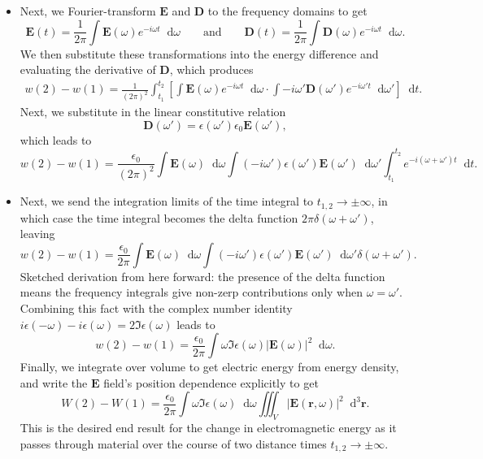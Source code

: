 \documentclass[11pt, a4paper]{article}
\newcommand{\diff}{\mathop{}\!\mathrm{d}} %
\newcommand{\dr}{\diff^{3} \r}  %
\renewcommand{\vec}[1]{\bm{#1}} %
\renewcommand{\r}{\vec{r}}
\newcommand{\E}{\vec{E}} %
\newcommand{\D}{\vec{D}}  %
\newcommand{\ee}{\epsilon_{0}}  %
\begin{document}
\begin{itemize}
    \item Next, we Fourier-transform $ \E $ and $ \D $ to the frequency domains to get
    \begin{equation*}
        \E(t) = \frac{1}{2\pi} \int \E(\omega) e^{-i\omega t} \diff \omega \qquad \text{and} \qquad \D(t) = \frac{1}{2\pi} \int \D(\omega) e^{-i\omega t} \diff \omega.
    \end{equation*}
    We then substitute these transformations into the energy difference and evaluating the derivative of $ \D $, which produces
    \begin{align*}
        w(2) - w(1) = \frac{1}{(2\pi)^{2}}\int_{t_{1}}^{t_{2}} \left[ \int \E(\omega)e^{-i\omega t} \diff \omega \cdot \int -i \omega' \D(\omega')e^{-i\omega't} \diff \omega' \right] \diff t.
    \end{align*}
    Next, we substitute in the linear constitutive relation
    \begin{equation*}
        \D(\omega') = \epsilon(\omega')\ee \E(\omega'),
    \end{equation*}
    which leads to
    \begin{equation*}
        w(2) - w(1) = \frac{\ee}{(2\pi)^{2}} \int \E(\omega) \diff \omega \int  (-i\omega')\epsilon(\omega')\E(\omega') \diff \omega' \int_{t_{1}}^{t_{2}} e^{-i(\omega + \omega')t} \diff t.
    \end{equation*}
    
    \item Next, we send the integration limits of the time integral to $ t_{1, 2} \to \pm \infty $, in which case the time integral becomes the delta function $ 2\pi \delta(\omega + \omega') $, leaving
    \begin{equation*}
        w(2) - w(1) = \frac{\ee}{2\pi} \int \E(\omega) \diff \omega \int  (-i\omega')\epsilon(\omega')\E(\omega') \diff \omega' \delta(\omega + \omega').
    \end{equation*}
    Sketched derivation from here forward: the presence of the delta function means the frequency integrals give non-zerp contributions only when $ \omega = \omega' $. Combining this fact with the complex number identity $ i\epsilon(-\omega) - i \epsilon(\omega) = 2\Im \epsilon(\omega)$ leads to
    \begin{equation*}
        w(2) - w(1) = \frac{\ee}{2\pi} \int \omega \Im \epsilon(\omega) \big |\E(\omega)\big |^{2}  \diff \omega.
    \end{equation*}
    Finally, we integrate over volume to get electric energy from energy density, and write the $ \E $ field's position dependence explicitly to get
    \begin{equation*}
        W(2) - W(1) = \frac{\ee}{2\pi} \int \omega \Im \epsilon(\omega) \diff \omega \iiint_{V} \big |\E(\r, \omega)\big |^{2} \dr.
    \end{equation*}
    This is the desired end result for the change in electromagnetic energy as it passes through material over the course of two distance times $ t_{1,2} \to \pm \infty $.


\end{itemize}
\end{document}
